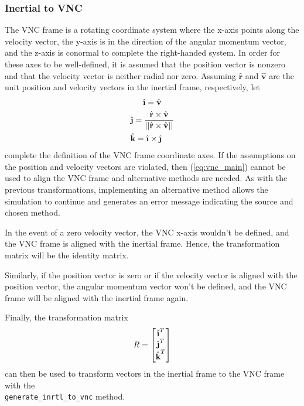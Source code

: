 \documentclass[11pt,fleqn]{report}
\begin{document}
\subsubsection{Inertial to VNC}
The VNC frame is a rotating coordinate system where the x-axis points along
the velocity vector, the y-axis is in the direction of the angular momentum
vector, and the z-axis is conormal to complete the right-handed system. In 
order for these axes to be well-defined, it is assumed that the position
vector is nonzero and that the velocity vector is neither radial nor zero.
Assuming $\hat{\textbf{r}}$ and $\hat{\textbf{v}}$
are the unit position and velocity vectors in the inertial frame,
respectively, let
\begin{multline}
 \hat{\textbf{\i}} = \hat{\textbf{v}} \\
 \hat{\textbf{\j}} = \frac{\hat{\textbf{r}} \times \hat{\textbf{v}}}
{||\hat{\textbf{r}} \times \hat{\textbf{v}} ||} \\
 \hat{\textbf{k}} = \hat{\textbf{\i}} \times \hat{\textbf{\j}} \hfill
 \label{eq:vnc_main}
 \end{multline}
complete the definition of the VNC frame coordinate axes.
If the assumptions on the position and velocity vectors are violated, then
(\ref{eq:vnc_main}) cannot be used to align the VNC frame and alternative methods are needed.
As with the previous transformations, implementing an alternative method allows the simulation
to continue and generates an error message indicating the source and chosen method.

In the event of a zero velocity vector, the VNC x-axis wouldn't be defined, and the VNC frame
is aligned with the inertial frame. Hence, the transformation matrix will be the identity 
matrix. 

Similarly, if the position vector is zero or if the velocity vector is aligned with the 
position vector, the angular momentum vector won't be defined, and the VNC frame will be 
aligned with the inertial frame again.

Finally, the transformation matrix
\begin{equation}
 \hfill R = \begin{bmatrix}
 \hat{\textbf{\i}}^T \\
 \hat{\textbf{\j}}^T \\
 \hat{\textbf{k}}^T
\end{bmatrix} \hfill
 \label{eq:vnc_mat}
\end{equation}
can then be used to transform vectors in the inertial frame to the
VNC frame with the \\ \texttt{generate\_inrtl\_to\_vnc} method.
\end{document}
